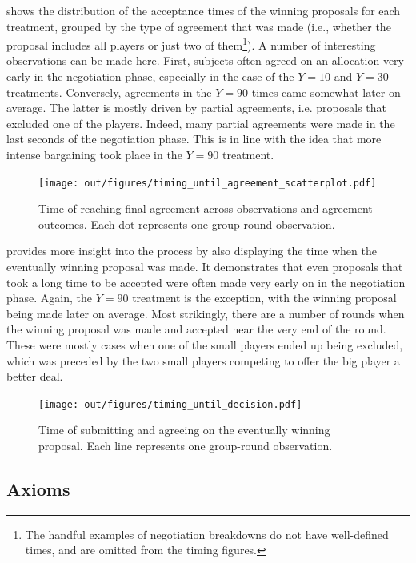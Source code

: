 \documentclass[12pt]{article}
\begin{document}
 shows the distribution of the acceptance times of the winning proposals for each treatment, grouped by the type of agreement that was made (i.e., whether the proposal includes all players or just two of them\footnote{The handful examples of negotiation breakdowns do not have well-defined times, and are omitted from the timing figures.}). A number of interesting observations can be made here. First, subjects often agreed on an allocation very early in the negotiation phase, especially in the case of the $Y=10$ and $Y=30$ treatments. Conversely, agreements in the $Y=90$ times came somewhat later on average. The latter is mostly driven by partial agreements, i.e. proposals that excluded one of the players. Indeed, many partial agreements were made in the last seconds of the negotiation phase. This is in line with the idea that more intense bargaining took place in the $Y=90$ treatment.

\begin{figure}
    \centering
    \texttt{[image: out/figures/timing\_until\_agreement\_scatterplot.pdf]}
    \caption{Time of reaching final agreement across observations and agreement outcomes. Each dot represents one group-round observation.}
    \label{fig:timing_scatterplot}
\end{figure}

 provides more insight into the process by also displaying the time when the eventually winning proposal was made. It demonstrates that even proposals that took a long time to be accepted were often made very early on in the negotiation phase. Again, the $Y=90$ treatment is the exception, with the winning proposal being made later on average. Most strikingly, there are a number of rounds when the winning proposal was made and accepted near the very end of the round. These were mostly cases when one of the small players ended up being excluded, which was preceded by the two small players competing to offer the big player a better deal.

\begin{figure}
    \centering
    \texttt{[image: out/figures/timing\_until\_decision.pdf]}
    \caption{Time of submitting and agreeing on the eventually winning proposal. Each line represents one group-round observation.}
    \label{fig:timing_lines}
\end{figure}



\subsection{Axioms}
\end{document}
